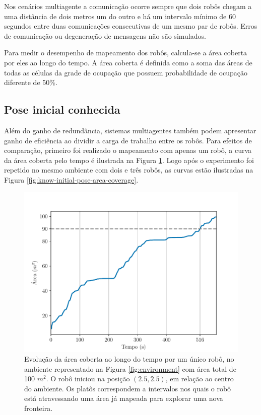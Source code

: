 Nos cenários multiagente a comunicação ocorre sempre que dois robôs 
chegam a uma distância de dois metros um do outro e há um intervalo 
mínimo de 60 segundos entre duas comunicações consecutivas de um mesmo 
par de robôs. Erros de comunicação ou degeneração de mensagens não são 
simulados.

Para medir o desempenho de mapeamento dos robôs, 
calcula-se a área coberta 
por eles ao longo do tempo. A área coberta é definida como a soma das 
áreas de todas as células da grade de ocupação que possuem probabilidade 
de ocupação diferente de 50\%.

\subsection{Pose inicial conhecida}
\label{sec:exp-known-initial-pose}
Além do ganho de redundância, sistemas multiagentes também podem 
apresentar ganho de eficiência ao dividir a carga de trabalho entre os 
robôs. Para efeitos de comparação, primeiro foi realizado o mapeamento 
com apenas um robô, a curva da área coberta pelo tempo é ilustrada na 
Figura \ref{fig:area-coverage-single-robot}. Logo após o experimento foi repetido no mesmo ambiente com dois e três 
robôs, as curvas estão ilustradas na Figura \ref{fig:know-initial-pose-area-coverage}.

\begin{figure}
  \centering
  \includegraphics[width=.6\textwidth]{figs/area_coverage_single_robot.pdf}
  \caption{Evolução da área coberta ao longo do tempo por um único robô, 
  no ambiente representado na Figura \ref{fig:environment} com área total 
  de 100 $m^2$. O robô iniciou na posição $(2.5, 2.5)$, em relação ao centro do ambiente. Os platôs correspondem a intervalos nos quais o robô está atravessando uma área já mapeada para explorar uma nova fronteira.}
  \label{fig:area-coverage-single-robot}
\end{figure}


